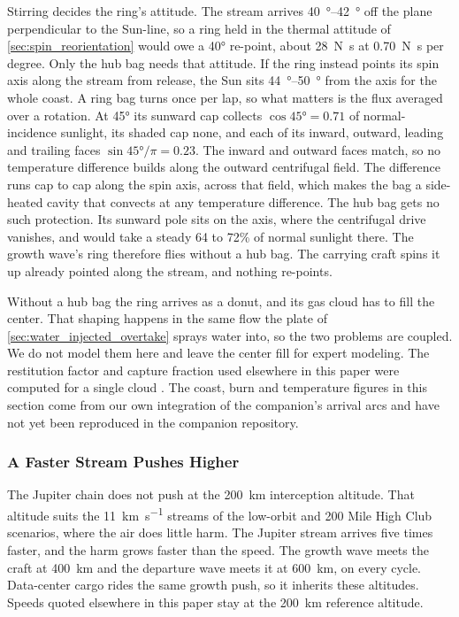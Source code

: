 \documentclass{article}
\begin{document}
Stirring decides the ring's attitude. The stream arrives \SIrange{40}{42}{\degree} off the plane perpendicular to the Sun-line, so a ring held in the thermal attitude of \autoref{sec:spin_reorientation} would owe a \ang{40} re-point, about \SI{28}{\newton\second} at \SI{0.70}{\newton\second} per degree. Only the hub bag needs that attitude. If the ring instead points its spin axis along the stream from release, the Sun sits \SIrange{44}{50}{\degree} from the axis for the whole coast. A ring bag turns once per lap, so what matters is the flux averaged over a rotation. At \ang{45} its sunward cap collects $\cos\ang{45} = 0.71$ of normal-incidence sunlight, its shaded cap none, and each of its inward, outward, leading and trailing faces $\sin\ang{45}/\pi = 0.23$. The inward and outward faces match, so no temperature difference builds along the outward centrifugal field. The difference runs cap to cap along the spin axis, across that field, which makes the bag a side-heated cavity that convects at any temperature difference. The hub bag gets no such protection. Its sunward pole sits on the axis, where the centrifugal drive vanishes, and would take a steady 64 to 72\% of normal sunlight there. The growth wave's ring therefore flies without a hub bag. The carrying craft spins it up already pointed along the stream, and nothing re-points.

Without a hub bag the ring arrives as a donut, and its gas cloud has to fill the center. That shaping happens in the same flow the plate of \autoref{sec:water_injected_overtake} sprays water into, so the two problems are coupled. We do not model them here and leave the center fill for expert modeling. The restitution factor and capture fraction used elsewhere in this paper were computed for a single cloud \cite{Katz_puffsat_impact_sim_2026}. The coast, burn and temperature figures in this section come from our own integration of the companion's arrival arcs and have not yet been reproduced in the companion repository.

\subsubsection{A Faster Stream Pushes Higher}\label{sec:jovian_meeting_altitudes}
The Jupiter chain does not push at the \SI{200}{\kilo\meter} interception altitude. That altitude suits the \SI{11}{\kilo\meter\per\second} streams of the low-orbit and 200 Mile High Club scenarios, where the air does little harm. The Jupiter stream arrives five times faster, and the harm grows faster than the speed. The growth wave meets the craft at \SI{400}{\kilo\meter} and the departure wave meets it at \SI{600}{\kilo\meter}, on every cycle. Data-center cargo rides the same growth push, so it inherits these altitudes. Speeds quoted elsewhere in this paper stay at the \SI{200}{\kilo\meter} reference altitude.
\end{document}
